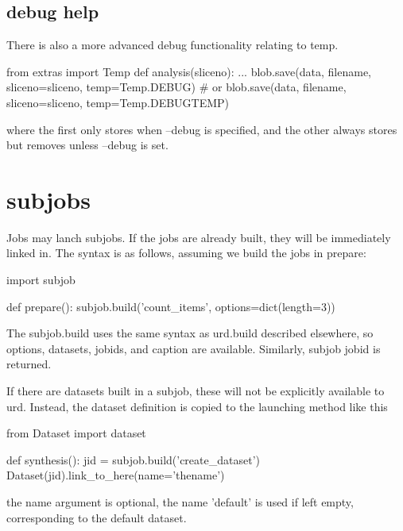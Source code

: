 \subsection{debug help}
There is also a more advanced debug functionality relating to temp.

\begin{python}
from extras import Temp
def analysis(sliceno):
  ...
  blob.save(data, filename, sliceno=sliceno, temp=Temp.DEBUG)
  # or
  blob.save(data, filename, sliceno=sliceno, temp=Temp.DEBUGTEMP)
\end{python}
where the first only stores when --debug is specified, and the other
always stores but removes unless --debug is set.


\newpage
\section{subjobs}

Jobs may lanch subjobs.  If the jobs are already built, they will be
immediately linked in.  The syntax is as follows, assuming we build
the jobs in prepare:

\begin{python}
import subjob

def prepare():
  subjob.build('count_items', options=dict(length=3))
\end{python}
The subjob.build uses the same syntax as urd.build described
elsewhere, so options, datasets, jobids, and caption are available.
Similarly, subjob jobid is returned.

If there are datasets built in a subjob, these will not be explicitly
available to urd.  Instead, the dataset definition is copied to the
launching method like this

\begin{python}
from Dataset import dataset

def synthesis():
  jid = subjob.build('create_dataset')
  Dataset(jid).link_to_here(name='thename')
\end{python}
the name argument is optional, the name 'default' is used if left
empty, corresponding to the default dataset.
